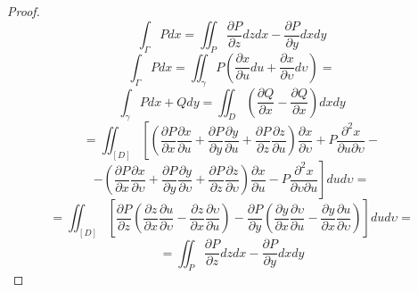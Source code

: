 \begin{proof}
  $$
  \int_{\Gamma} P dx = \iint_P
    \frac{\partial P}{\partial z} dz dx
    -
    \frac{\partial P}{\partial y} dx dy
  $$
  $$
  \int_{\Gamma} P dx = \iint_{\gamma}
    P
    \left(
      \frac{\partial x}{\partial u} du
      +
      \frac{\partial x}{\partial \upsilon} d\upsilon
    \right)
  =
  $$
  $$
  \int_{\gamma} Pdx + Qdy = \iint_D
    \left(
      \frac{\partial Q}{\partial x}
      -
      \frac{\partial Q}{\partial x}
    \right)
    dx dy
  $$
  $$
  = \iint_{[D]}
    \left[
      \left(
        \frac{\partial P}{\partial x}
        \frac{\partial x}{\partial u}
        +
        \frac{\partial P}{\partial y}
        \frac{\partial y}{\partial u}
        +
        \frac{\partial P}{\partial z}
        \frac{\partial z}{\partial u}
      \right)
      \frac{\partial x}{\partial \upsilon}
      +
      P \frac{\partial^2 x}{\partial u \partial \upsilon}
    \right.
    -
  $$
  $$
    \left.
      -
      \left(
        \frac{\partial P}{\partial x}
        \frac{\partial x}{\partial \upsilon}
        +
        \frac{\partial P}{\partial y}
        \frac{\partial y}{\partial \upsilon}
        +
        \frac{\partial P}{\partial z}
        \frac{\partial z}{\partial \upsilon}
      \right)
      \frac{\partial x}{\partial u}
      -
      P \frac{\partial^2 x}{\partial \upsilon \partial u}
    \right]
    du d\upsilon
  =
  $$
  $$
  = \iint_{[D]}
    \left[
      \frac{\partial P}{\partial z}
      \left(
        \frac{\partial z}{\partial x}
        \frac{\partial u}{\partial \upsilon}
        -
        \frac{\partial z}{\partial x}
        \frac{\partial \upsilon}{\partial u}
      \right)
      -
      \frac{\partial P}{\partial y}
      \left(
        \frac{\partial y}{\partial x}
        \frac{\partial \upsilon}{\partial u}
        -
        \frac{\partial y}{\partial x}
        \frac{\partial u}{\partial \upsilon}
      \right)
    \right]
    du d\upsilon =
  $$
  $$
  = \iint_P
    \frac{\partial P}{\partial z} dz dx
    -
    \frac{\partial P}{\partial y} dx dy
  $$
\end{proof}
